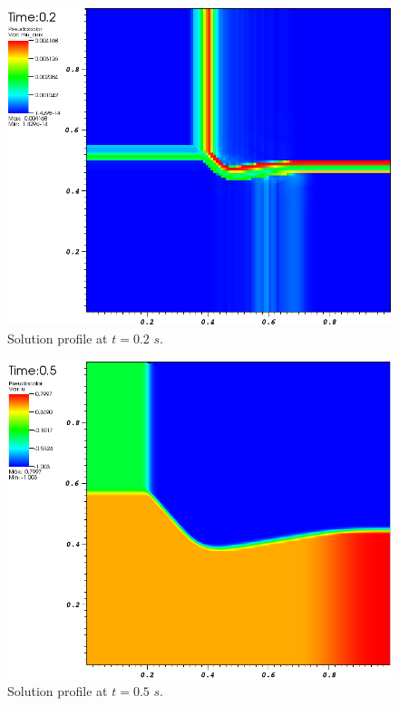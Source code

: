 \begin{figure}[H]
	\centering
	\includegraphics[width=\textwidth]{figures/Burger2D_visc_t0p2.png}
	\caption{Solution profile at $t=0.2$ $s$.}
	\label{fig:2d_burger_visc_t0p2}
\end{figure}
%
\begin{figure}[H]
	\centering
	\includegraphics[width=\textwidth]{figures/Burger2D_sol_t0p5.png}
	\caption{Solution profile at $t=0.5$ $s$.}
	\label{fig:2d_burger_sol_t0p5}
\end{figure}
%
